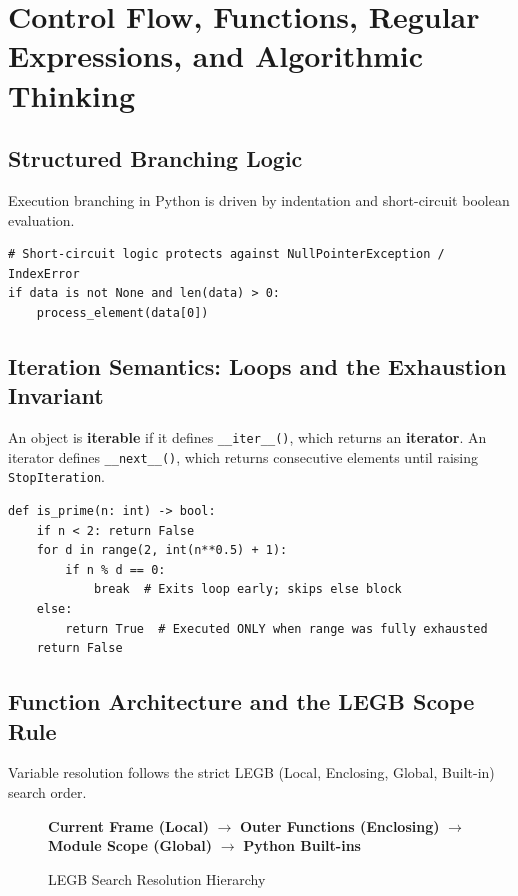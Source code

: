 \chapter{Control Flow, Functions, Regular Expressions, and Algorithmic Thinking}
\label{chap:control-flow}

\section{Structured Branching Logic}
Execution branching in Python is driven by indentation and short-circuit boolean evaluation.
\begin{lstlisting}
# Short-circuit logic protects against NullPointerException / IndexError
if data is not None and len(data) > 0:
    process_element(data[0])
\end{lstlisting}

\section{Iteration Semantics: Loops and the Exhaustion Invariant}
\begin{definition}
An object is \textbf{iterable} if it defines \texttt{\_\_iter\_\_()}, which returns an \textbf{iterator}. An iterator defines \texttt{\_\_next\_\_()}, which returns consecutive elements until raising \texttt{StopIteration}.
\end{definition}

\begin{methodbox}
\begin{lstlisting}
def is_prime(n: int) -> bool:
    if n < 2: return False
    for d in range(2, int(n**0.5) + 1):
        if n % d == 0:
            break  # Exits loop early; skips else block
    else:
        return True  # Executed ONLY when range was fully exhausted
    return False
\end{lstlisting}
\end{methodbox}

\section{Function Architecture and the LEGB Scope Rule}
Variable resolution follows the strict LEGB (Local, Enclosing, Global, Built-in) search order.
\begin{figure}[htbp]
\centering
\begin{tcolorbox}[colback=boxnavybg,colframe=brandnavy,title={Scope Resolution Pipeline (LEGB)}]
\small
\textbf{Current Frame (Local)} $\longrightarrow$ \textbf{Outer Functions (Enclosing)} $\longrightarrow$ \textbf{Module Scope (Global)} $\longrightarrow$ \textbf{Python Built-ins}
\end{tcolorbox}
\caption{LEGB Search Resolution Hierarchy}
\end{figure}

